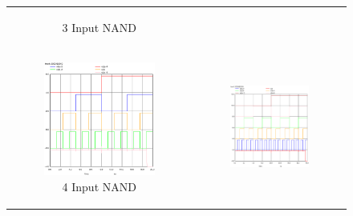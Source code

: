 \documentclass[conference]{IEEEtran}
\begin{document}
\begin{figure}[H]
\begin{tabular}{cc}
\begin{subfigure}{0.44\linewidth}
            \caption{3 Input NAND}
        \end{subfigure} \\
        \begin{subfigure}{0.44\linewidth}
            \centering
            \includegraphics[width=\textwidth]{images/nand_4_cmos_tran.eps}
            \caption{4 Input NAND}
        \end{subfigure} &
        \begin{subfigure}{0.44\linewidth}
            \centering
            \includegraphics[width=\textwidth]{images/nand_5_cmos_tran.eps}

\end{subfigure}
\end{tabular}
\end{figure}
\end{document}
